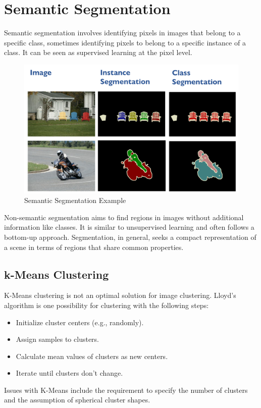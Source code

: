 \section{Semantic Segmentation}

Semantic segmentation involves identifying pixels in images that belong to a specific class,
sometimes identifying pixels to belong to a specific instance of a class. It can be seen as supervised learning at the pixel level.

\begin{figure}[h]
	\centering
	\includegraphics[width=0.7\linewidth]{img/semantic_segmentation}
	\caption{Semantic Segmentation Example}
\end{figure}

Non-semantic segmentation aims to find regions in images without additional information like classes.
It is similar to unsupervised learning and often follows a bottom-up approach.
Segmentation, in general, seeks a compact representation of a scene in terms of regions that share common properties.

\subsection{k-Means Clustering}

K-Means clustering is not an optimal solution for image clustering. Lloyd's algorithm is one possibility for clustering with the following steps:
\begin{itemize}
	\item Initialize cluster centers (e.g., randomly).
	\item Assign samples to clusters.
	\item Calculate mean values of clusters as new centers.
	\item Iterate until clusters don't change.
\end{itemize}
Issues with K-Means include the requirement to specify the number of clusters and the assumption of spherical cluster shapes.

